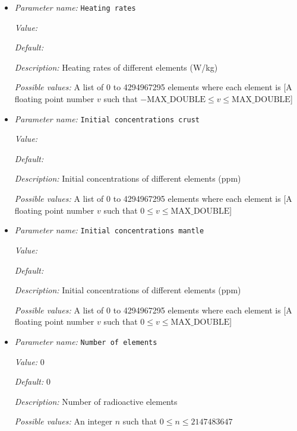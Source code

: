 \begin{itemize}
{\it Possible values:} A list of 0 to 4294967295 elements where each element is [A floating point number $v$ such that $0 \leq v \leq \text{MAX\_DOUBLE}$]
\item {\it Parameter name:} {\tt Heating rates}
\label{parameters:Heating model/Radioactive decay/Heating rates}


{\it Value:} 


{\it Default:} 


{\it Description:} Heating rates of different elements (W/kg)


{\it Possible values:} A list of 0 to 4294967295 elements where each element is [A floating point number $v$ such that $-\text{MAX\_DOUBLE} \leq v \leq \text{MAX\_DOUBLE}$]
\item {\it Parameter name:} {\tt Initial concentrations crust}
\label{parameters:Heating model/Radioactive decay/Initial concentrations crust}


{\it Value:} 


{\it Default:} 


{\it Description:} Initial concentrations of different elements (ppm)


{\it Possible values:} A list of 0 to 4294967295 elements where each element is [A floating point number $v$ such that $0 \leq v \leq \text{MAX\_DOUBLE}$]
\item {\it Parameter name:} {\tt Initial concentrations mantle}
\label{parameters:Heating model/Radioactive decay/Initial concentrations mantle}


{\it Value:} 


{\it Default:} 


{\it Description:} Initial concentrations of different elements (ppm)


{\it Possible values:} A list of 0 to 4294967295 elements where each element is [A floating point number $v$ such that $0 \leq v \leq \text{MAX\_DOUBLE}$]
\item {\it Parameter name:} {\tt Number of elements}
\label{parameters:Heating model/Radioactive decay/Number of elements}


{\it Value:} 0


{\it Default:} 0


{\it Description:} Number of radioactive elements


{\it Possible values:} An integer $n$ such that $0\leq n \leq 2147483647$
\end{itemize}

